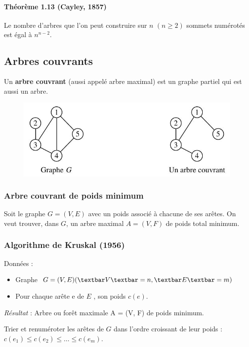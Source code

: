 \paragraph*{Théorème 1.13 (Cayley, 1857)}
Le nombre d'arbres que l'on peut construire sur $ n $ $ (n \geq 2) $ sommets numérotés est
égal à $ n^{n-2} $.

\subsection{Arbres couvrants}
Un \textbf{arbre couvrant} (aussi appelé arbre maximal) est un graphe partiel qui est aussi un
arbre.

\begin{figure}[h]
\centering
\includegraphics[width=0.7\linewidth]{images/graph16}
\end{figure}

\subsubsection{Arbre couvrant de poids minimum}
Soit le graphe $ G = (V, E) $ avec un poids associé à chacune de ses arêtes. On veut trouver,
dans $ G $, un arbre maximal $ A = (V, F) $ de poids total minimum.

\subsubsection*{Algorithme de Kruskal (1956)}
Données :
\begin{itemize}
	\item Graphe $ G = (V, E) (\textbar V \textbar = n, \textbar E \textbar = m) $
	\item Pour chaque arête e de $ E $ , son poids $ c(e) $.
\end{itemize}
\textit{Résultat} : Arbre ou forêt maximale A = (V, F) de poids minimum.

Trier et renuméroter les arêtes de $ G $ dans l'ordre croissant de leur poids :
$ c(e_{1} ) \leq c(e_{2} ) \leq \dots \leq c(e_{m}) $.
%
%

